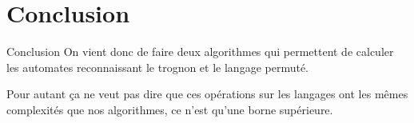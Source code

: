 \section{Conclusion}


\begin{frame}{\myframetitle}
  \begin{block}{Conclusion}
    On vient donc de faire deux algorithmes qui permettent de calculer les
    automates reconnaissant le trognon et le langage permuté.

    \pause[]
    \vphantom{}

    Pour autant ça ne veut pas dire que ces opérations sur les langages ont
    les mêmes complexités que nos algorithmes, ce n'est qu'une borne
    supérieure.
  \end{block}
\end{frame}
